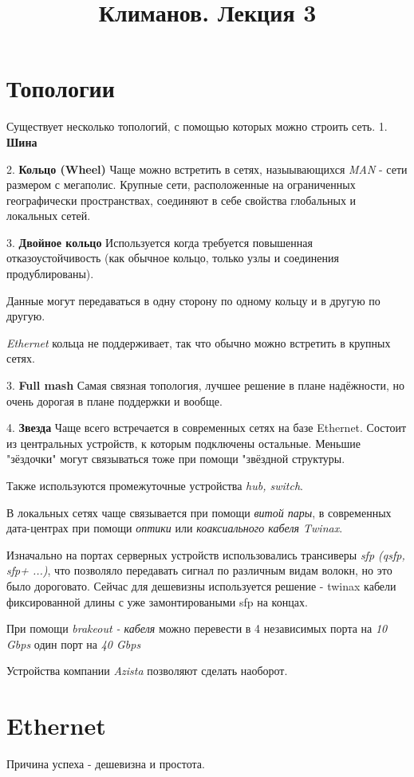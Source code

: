\documentclass[a4paper,10pt]{article}
\title{Климанов. Лекция 3}
\begin{document}
	\maketitle
	\section{Топологии}
	Существует несколько топологий, с помощью которых можно строить сеть.
	1. \textbf{Шина}
	
	2. \textbf{Кольцо (Wheel)}
	Чаще можно встретить в сетях, назыывающихся \emph{MAN} - сети размером с мегаполис. Крупные сети, расположенные на ограниченных географически пространствах, соединяют в себе свойства глобальных и локальных сетей.
	
	3. \textbf{Двойное кольцо}
	Используется когда требуется повышенная отказоустойчивость (как обычное кольцо, только узлы и соединения продублированы). 
	
	Данные могут передаваться в одну сторону по одному кольцу и в другую по другую.
	
	\emph{Ethernet} кольца не поддерживает, так что обычно можно встретить в крупных сетях.
	
	3. \textbf{Full mash} Самая связная топология, лучшее решение в плане надёжности, но очень дорогая в плане поддержки и вообще. 
	
	4. \textbf{Звезда} Чаще всего встречается в современных сетях на базе Ethernet. Состоит из центральных устройств, к которым подключены остальные. Меньшие "зёздочки" могут связываться тоже при помощи "звёздной структуры.
	
	Также используются промежуточные устройства \emph{hub, switch}.
	
	В локальных сетях чаще связывается при помощи \emph{витой пары}, в современных дата-центрах при помощи \emph{оптики} или \emph{коаксиального кабеля Twinax}.
	
	Изначально на портах серверных устройств использовались трансиверы \emph{sfp  (qsfp, sfp+ ...)}, что позволяло передавать сигнал по различным видам волокн, но это было дороговато.
	Сейчас для дешевизны используется решение - twinax кабели фиксированной длины с уже замонтироваными sfp на концах. 
	
	При помощи \emph{brakeout - кабеля} можно перевести в 4 независимых порта на \emph{10 Gbps} один порт на \emph{40 Gbps}
	
	Устройства компании \emph{Azista} позволяют сделать наоборот.
	
	\section{Ethernet}
	Причина успеха - дешевизна и простота.
	
\end{document}
